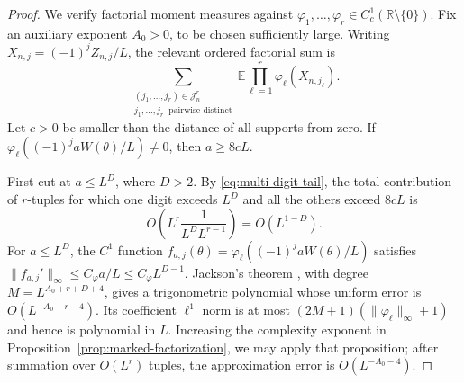 \documentclass[11pt,a4paper]{amsart}
\theoremstyle{definition}
\theoremstyle{remark}
\newcommand{\R}{\mathbb R}
\newcommand{\E}{\mathbb E}
\begin{document}
\begin{proof}
We verify factorial moment measures against
$\varphi_1,\ldots,\varphi_r\in C_c^1(\R\setminus\{0\})$.
Fix an auxiliary exponent $A_0>0$, to be chosen sufficiently large.
Writing $X_{n,j}=(-1)^jZ_{n,j}/L$, the relevant ordered factorial sum is
\begin{equation}\label{eq:ordered-factorial-sum}
 \sum_{\substack{(j_1,\ldots,j_r)\in\mathcal J_n^r\\
                  j_1,\ldots,j_r\ \text{ pairwise distinct}}}
 \E\prod_{\ell=1}^r\varphi_\ell(X_{n,j_\ell}).
\end{equation}
Let $c>0$ be smaller than the distance of all supports from zero.  If
$\varphi_\ell((-1)^jaW(\theta)/L)\ne0$, then $a\ge8cL$.

First cut at $a\le L^D$, where $D>2$.  By
\eqref{eq:multi-digit-tail}, the total contribution of $r$-tuples for which
one digit exceeds $L^D$ and all the others exceed $8cL$ is
\[
 O\left(L^r\frac1{L^D L^{r-1}}\right)=O(L^{1-D}).
\]
For $a\le L^D$, the $C^1$ function
$f_{a,j}(\theta)=\varphi_\ell((-1)^jaW(\theta)/L)$ satisfies
$\|f_{a,j}'\|_\infty\le C_\varphi a/L\le C_\varphi L^{D-1}$.
Jackson's theorem \cite[Vol.~I, Chap.~III]{Zygmund59}, with degree
$M=L^{A_0+r+D+4}$, gives a trigonometric
polynomial whose uniform error is $O(L^{-A_0-r-4})$.  Its coefficient
$\ell^1$ norm is at most
$(2M+1)(\|\varphi_\ell\|_\infty+1)$ and hence is polynomial in $L$.
Increasing the complexity exponent in
Proposition~\ref{prop:marked-factorization}, we may apply that proposition;
after summation over $O(L^r)$ tuples, the approximation error is
$O(L^{-A_0-4})$.


\end{proof}
\end{document}
